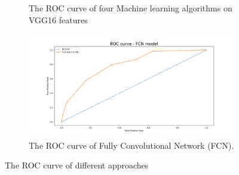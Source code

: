 \begin{figure}
\begin{subfigure}[b]{0.45\textwidth}
         \caption{The ROC curve of four Machine learning algorithms on VGG16 features}
         \label{fig:ROC_vgg}
     \end{subfigure}
     \hfill
     \begin{subfigure}[b]{.45\textwidth}
         \centering
         \includegraphics[width=1\textwidth]{manuscript/src/figures/project/roc_curve_FCN 2021-04-09-11:12:24-tree-Mobnet-standardization.png}
         \caption{The ROC curve of Fully Convolutional Network (FCN).}
         \label{fig:ROC_fcn}
     \end{subfigure} 
        \caption{The ROC curve of different approaches}
        \label{fig:ROC}
\end{figure}

